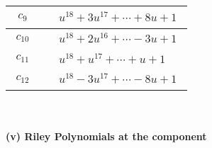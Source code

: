 \documentclass[1p]{elsarticle_modified}
\theoremstyle{definition}
\begin{document}
\begin{tabular}{m{50pt}|m{274pt}}
\hline $$\begin{aligned}c_{9}\end{aligned}$$&$\begin{aligned}
&u^{18}+3 u^{17}+\cdots+8 u+1
\end{aligned}$\\
\hline $$\begin{aligned}c_{10}\end{aligned}$$&$\begin{aligned}
&u^{18}+2 u^{16}+\cdots-3 u+1
\end{aligned}$\\
\hline $$\begin{aligned}c_{11}\end{aligned}$$&$\begin{aligned}
&u^{18}+u^{17}+\cdots+u+1
\end{aligned}$\\
\hline $$\begin{aligned}c_{12}\end{aligned}$$&$\begin{aligned}
&u^{18}-3 u^{17}+\cdots-8 u+1
\end{aligned}$\\
\hline
\end{tabular}\\~\\
\newpage\renewcommand{\arraystretch}{1}
\flushleft \textbf{(v) Riley Polynomials at the component}\newline \\
\end{document}
